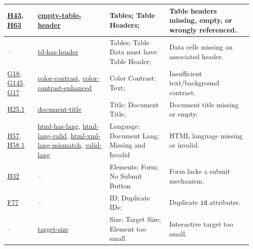 \begin{table}[htbp]
\begin{tabularx}{\textwidth}{|L{2cm}|L{4.5cm}|L{3.5cm}|Y|}
\href{https://www.w3.org/TR/WCAG20-TECHS/H43.html}{H43},
\href{https://www.w3.org/TR/WCAG20-TECHS/H63.html}{H63} &
\href{https://dequeuniversity.com/rules/axe/4.10/empty-table-header}{empty-table-header} &
Tables; Table Headers; &
Table headers missing, empty, or wrongly referenced.\\ \hline


-- &
\href{https://dequeuniversity.com/rules/axe/4.10/td-has-header}{td-has-header} &
Tables; Table Data must have Table Header; &
Data cells missing an associated header.\\ \hline


\href{https://www.w3.org/TR/WCAG20-TECHS/G18.html}{G18},
\href{https://www.w3.org/TR/WCAG20-TECHS/G145.html}{G145},
\href{https://www.w3.org/TR/WCAG20-TECHS/G17.html}{G17} &
\href{https://dequeuniversity.com/rules/axe/4.10/color-contrast}{color-contrast},
\href{https://dequeuniversity.com/rules/axe/4.10/color-contrast-enhanced}{color-contrast-enhanced} &
Color Contrast; Text; &
Insufficient text/background contrast.\\ \hline


\href{https://www.w3.org/TR/WCAG20-TECHS/H25.html}{H25.1} &
\href{https://dequeuniversity.com/rules/axe/4.10/document-title}{document-title} &
Title; Document Title; &
Document title missing or empty.\\ \hline


\href{https://www.w3.org/TR/WCAG20-TECHS/H57.html}{H57},
\href{https://www.w3.org/TR/WCAG20-TECHS/H58.html}{H58.1} &
\href{https://dequeuniversity.com/rules/axe/4.10/html-has-lang}{html-has-lang},
\href{https://dequeuniversity.com/rules/axe/4.10/html-lang-valid}{html-lang-valid},
\href{https://dequeuniversity.com/rules/axe/4.10/html-xml-lang-mismatch}{html-xml-lang-mismatch},
\href{https://dequeuniversity.com/rules/axe/4.10/valid-lang}{valid-lang} &
Language; Document Lang; Missing and Invalid &
HTML language missing or invalid.\\ \hline


\href{https://www.w3.org/TR/WCAG20-TECHS/H32.html}{H32} &
-- &
Elements; Form; No Submit Button &
Form lacks a submit mechanism.\\ \hline


\href{https://www.w3.org/TR/WCAG20-TECHS/F77.html}{F77} &
-- &
ID; Duplicate IDs; &
Duplicate \texttt{id} attributes.\\ \hline


-- &
\href{https://dequeuniversity.com/rules/axe/4.10/target-size}{target-size} &
Size; Target Size; Element too small &
Interactive target too small.\\ \hline



\end{tabularx}
\end{table}
